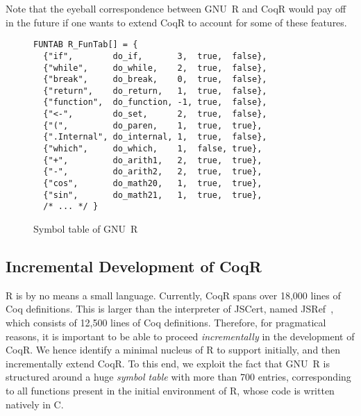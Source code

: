 \documentclass[
    sigplan,
    10pt,
    review, %
    natbib=false %
 ]{acmart}
\newcommand\mb[1]{\todo[color=purple!20,size=\scriptsize]{#1}}
\newcommand\mbi[1]{\todo[color=purple!20,inline]{#1}}
\newcommand\et[1]{\todo[color=blue!20,size=\scriptsize]{#1}}
\newcommand\CoqR{CoqR}
\newcommand\newtext[1]{{\color{blue} #1}}
\begin{document}

Note that the eyeball correspondence between GNU~R and \CoqR{} would pay off in the future if one wants to extend \CoqR{} to account for some of these features.


\begin{figure}
\begin{verbatim}
FUNTAB R_FunTab[] = {
  {"if",        do_if,       3,  true,  false},
  {"while",     do_while,    2,  true,  false},
  {"break",     do_break,    0,  true,  false},
  {"return",    do_return,   1,  true,  false},
  {"function",  do_function, -1, true,  false},
  {"<-",        do_set,      2,  true,  false},
  {"(",         do_paren,    1,  true,  true},
  {".Internal", do_internal, 1,  true,  false},
  {"which",     do_which,    1,  false, true},
  {"+",         do_arith1,   2,  true,  true},
  {"-",         do_arith2,   2,  true,  true},
  {"cos",       do_math20,   1,  true,  true},
  {"sin",       do_math21,   1,  true,  true},
  /* ... */ }
\end{verbatim}
\vspace{-1em}
    \caption{Symbol table of GNU~R}
    \label{fig:names}
\end{figure}


\subsection{Incremental Development of \CoqR{}}
\label{sec:coq:structure}

R is by no means a small language.
Currently, \CoqR{} spans over 18,000 lines of Coq definitions.
This is larger than the interpreter of JSCert, named JSRef~\parencite{popl14jscert}, which consists of 12,500 lines of Coq definitions.
Therefore, for pragmatical reasons, it is important to be able to proceed {\em incrementally} in the development of \CoqR{}.
We hence identify a minimal nucleus of R to support initially, and then incrementally extend \CoqR{}.
To this end, we exploit the fact that GNU~R is structured around a huge {\em symbol table} \newtext{with more than 700 entries}, corresponding to all functions present in the initial environment of R, whose code is written natively in C.
\end{document}
